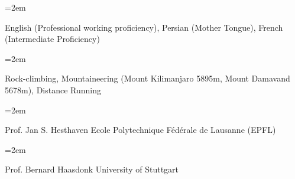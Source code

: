 \documentclass{scrartcl}
\newcommand{\Description}[1]{\hangindent=2em\hangafter=0\noindent\raggedright\footnotesize{#1}\par\normalsize\vspace{1em}} %
\begin{document}
\begin{cv}{}
\vspace{1em}

\Description{English (Professional working proficiency), Persian (Mother Tongue), French (Intermediate Proficiency)}

\newpage

\vspace{1em}

\Description{Rock-climbing, Mountaineering (Mount Kilimanjaro 5895m, Mount Damavand 5678m), Distance Running}



\vspace{1em}

\Description{Prof. Jan S. Hesthaven \newline Ecole Polytechnique F\'ed\'erale de Lausanne (EPFL)}

\vspace{1em}

\Description{Prof. Bernard Haasdonk \newline University of Stuttgart}

\end{cv}
\end{document}

